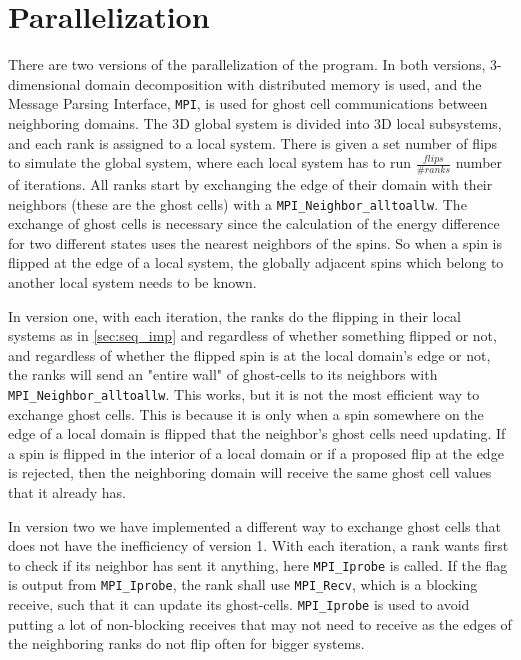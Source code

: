 \documentclass{article}
\begin{document}
\section{Parallelization}
There are two versions of the parallelization of the program. In both versions, 3-dimensional domain decomposition with distributed memory is used, and the Message Parsing Interface\autocite{mpi41}, \texttt{MPI}, is used for ghost cell communications between neighboring domains. The 3D global system is divided into 3D local subsystems, and each rank is assigned to a local system. There is given a set number of flips to simulate the global system, where each local system has to run $\frac{flips}{\#ranks}$ number of iterations. All ranks start by exchanging the edge of their domain with their neighbors (these are the ghost cells) with a \texttt{MPI\_Neighbor\_alltoallw}. The exchange of ghost cells is necessary since the calculation of the energy difference for two different states uses the nearest neighbors of the spins. So when a spin is flipped at the edge of a local system, the globally adjacent spins which belong to another local system needs to be known.

In version one, with each iteration, the ranks do the flipping in their local systems as in \cref{sec:seq_imp} and regardless of whether something flipped or not, and regardless of whether the flipped spin is at the local domain's edge or not, the ranks will send an "entire wall" of ghost-cells to its neighbors with \texttt{MPI\_Neighbor\_alltoallw}. This works, but it is not the most efficient way to exchange ghost cells. This is because it is only when a spin somewhere on the edge of a local domain is flipped that the neighbor's ghost cells need updating. If a spin is flipped in the interior of a local domain or if a proposed flip at the edge is rejected, then the neighboring domain will receive the same ghost cell values that it already has.

In version two we have implemented a different way to exchange ghost cells that does not have the inefficiency of version 1. With each iteration, a rank wants first to check if its neighbor has sent it anything, here \texttt{MPI\_Iprobe} is called. If the flag is output from \texttt{MPI\_Iprobe}, the rank shall use \texttt{MPI\_Recv}, which is a blocking receive, such that it can update its ghost-cells. \texttt{MPI\_Iprobe} is used to avoid putting a lot of non-blocking receives that may not need to receive as the edges of the neighboring ranks do not flip often for bigger systems.
\end{document}
